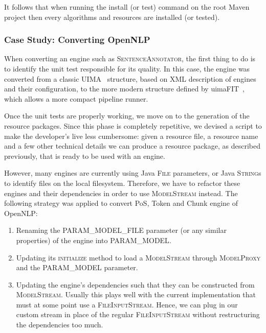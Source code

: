 \documentclass{article}
\newcommand{\ID}[1]{{\textsc{#1}}}
\begin{document}
\begin{appendices}
It follows that when running the install (or test) command on the root Maven project then every
algorithms and resources are installed (or tested).

\subsubsection{Case Study: Converting OpenNLP}

When converting an engine such as \ID{SentenceAnnotator}, the first thing to do is to identify the
unit test responsible for its quality. In this case, the engine was converted from a classic
UIMA~\cite{uima} structure, based on XML description of engines and their configuration, to the more
modern structure defined by uimaFIT~\cite{uimafit}, which allows a more compact pipeline runner.

Once the unit tests are properly working, we move on to the generation of the resource packages.
Since this phase is completely repetitive, we devised a script to make the developer's live less
cumbersome: given a resource file, a resource name and a few other technical details we can produce
a resource package, as described previously, that is ready to be used with an engine.

However, many engines are currently using Java \ID{File} parameters, or Java \ID{String}s to
identify files on the local filesystem. Therefore, we have to refactor these engines and their
dependencies in order to use \ID{ModelStream} instead. The following strategy was applied to convert
PoS, Token and Chunk engine of OpenNLP:

\begin{enumerate}

    \item Renaming the \ID{PARAM\_MODEL\_FILE} parameter (or any similar properties) of the engine
        into \ID{PARAM\_MODEL}.

    \item Updating its \ID{initialize} method to load a \ID{ModelStream} through \ID{ModelProxy} and the
        \ID{PARAM\_MODEL} parameter.

    \item Updating the engine's dependencies such that they can be constructed from \ID{ModelStream}.
        Usually this plays well with the current implementation that must at some point use a
        \ID{FileInputStream}. Hence, we can plug in our custom stream in place of the regular
        \ID{FileInputStream} without restructuring the dependencies too much.


\end{enumerate}
\end{appendices}
\end{document}
